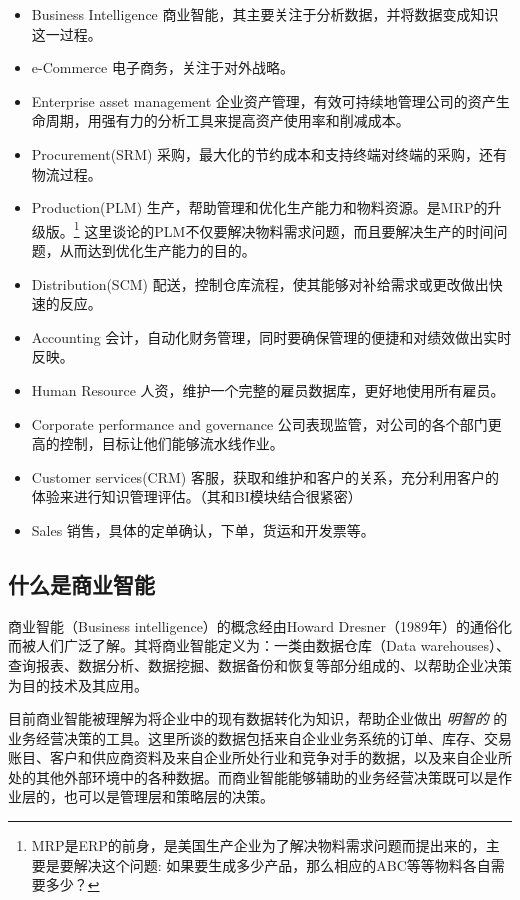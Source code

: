 \documentclass[11pt,a4paper]{sphinxmanual}
\begin{document}
\begin{itemize}
\item Business Intelligence 商业智能，其主要关注于分析数据，并将数据变成知识这一过程。
\item e-Commerce 电子商务，关注于对外战略。
\item Enterprise asset management 企业资产管理，有效可持续地管理公司的资产生命周期，用强有力的分析工具来提高资产使用率和削减成本。

\item Procurement(SRM) 采购，最大化的节约成本和支持终端对终端的采购，还有物流过程。
\item Production(PLM) 生产，帮助管理和优化生产能力和物料资源。是MRP的升级版。\footnote{MRP是ERP的前身，是美国生产企业为了解决物料需求问题而提出来的，主要是要解决这个问题: 如果要生成多少产品，那么相应的ABC等等物料各自需要多少？} 这里谈论的PLM不仅要解决物料需求问题，而且要解决生产的时间问题，从而达到优化生产能力的目的。

\item Distribution(SCM) 配送，控制仓库流程，使其能够对补给需求或更改做出快速的反应。
\item Accounting 会计，自动化财务管理，同时要确保管理的便捷和对绩效做出实时反映。
\item Human Resource 人资，维护一个完整的雇员数据库，更好地使用所有雇员。
\item Corporate performance and governance 公司表现监管，对公司的各个部门更高的控制，目标让他们能够流水线作业。
\item Customer services(CRM) 客服，获取和维护和客户的关系，充分利用客户的体验来进行知识管理评估。（其和BI模块结合很紧密）
\item Sales 销售，具体的定单确认，下单，货运和开发票等。
\end{itemize}



\subsection{什么是商业智能}
\label{sec-1-2-1}
商业智能（Business intelligence）的概念经由Howard Dresner（1989年）的通俗化而被人们广泛了解。其将商业智能定义为：一类由数据仓库（Data warehouses）、查询报表、数据分析、数据挖掘、数据备份和恢复等部分组成的、以帮助企业决策为目的技术及其应用。

目前商业智能被理解为将企业中的现有数据转化为知识，帮助企业做出 \emph{明智的} 的业务经营决策的工具。这里所谈的数据包括来自企业业务系统的订单、库存、交易账目、客户和供应商资料及来自企业所处行业和竞争对手的数据，以及来自企业所处的其他外部环境中的各种数据。而商业智能能够辅助的业务经营决策既可以是作业层的，也可以是管理层和策略层的决策。
\end{document}
